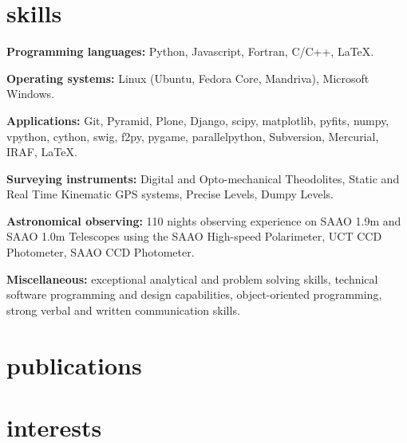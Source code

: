 \documentclass[]{friggeri-cv} %
\begin{document}

\section{skills}

\textbf{Programming languages:} Python, Javascript, Fortran, C/C++, \LaTeX.

\textbf{Operating systems:} Linux (Ubuntu, Fedora Core, Mandriva), Microsoft Windows.

\textbf{Applications:} Git, Pyramid, Plone, Django, scipy, matplotlib, pyfits, numpy, vpython, cython, swig, f2py, pygame, parallelpython, Subversion, Mercurial, IRAF, \LaTeX.

\textbf{Surveying instruments:} Digital and Opto-mechanical Theodolites, Static and Real Time Kinematic GPS
    systems, Precise Levels, Dumpy Levels.
    
\textbf{Astronomical observing:} 110 nights observing experience on SAAO 1.9m and SAAO 1.0m Telescopes using
     the SAAO High-speed Polarimeter, UCT CCD Photometer, SAAO CCD Photometer.

\textbf{Miscellaneous:} exceptional analytical and problem solving skills, technical software programming and design capabilities, object-oriented programming, strong verbal and written communication skills.



\begin{entrylist}
\end{entrylist}
\section{publications}


\section{interests}
\end{document}
